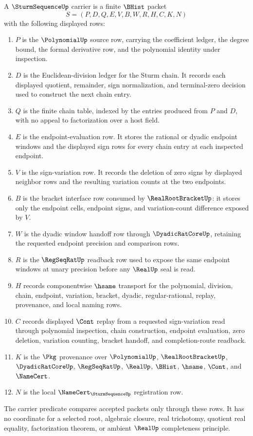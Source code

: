 \begin{definition}
\label{def:sturm-sequence-real-carrier}
A $\SturmSequenceUp$ carrier is a finite $\BHist$ packet
$$
S=(P,D,Q,E,V,B,W,R,H,C,K,N)
$$
with the following displayed rows:
\begin{enumerate}
\item $P$ is the $\PolynomialUp$ source row, carrying the coefficient ledger, the degree bound, the formal derivative row, and the polynomial identity under inspection.
\item $D$ is the Euclidean-division ledger for the Sturm chain. It records each displayed quotient, remainder, sign normalization, and terminal-zero decision used to construct the next chain entry.
\item $Q$ is the finite chain table, indexed by the entries produced from $P$ and $D$, with no appeal to factorization over a host field.
\item $E$ is the endpoint-evaluation row. It stores the rational or dyadic endpoint windows and the displayed sign rows for every chain entry at each inspected endpoint.
\item $V$ is the sign-variation row. It records the deletion of zero signs by displayed neighbor rows and the resulting variation counts at the two endpoints.
\item $B$ is the bracket interface row consumed by $\RealRootBracketUp$: it stores only the endpoint cells, endpoint signs, and variation-count difference exposed by $V$.
\item $W$ is the dyadic window handoff row through $\DyadicRatCoreUp$, retaining the requested endpoint precision and comparison rows.
\item $R$ is the $\RegSeqRatUp$ readback row used to expose the same endpoint windows at unary precision before any $\RealUp$ seal is read.
\item $H$ records componentwise $\hsame$ transport for the polynomial, division, chain, endpoint, variation, bracket, dyadic, regular-rational, replay, provenance, and local naming rows.
\item $C$ records displayed $\Cont$ replay from a requested sign-variation read through polynomial inspection, chain construction, endpoint evaluation, zero deletion, variation counting, bracket handoff, and completion-route readback.
\item $K$ is the $\Pkg$ provenance over $\PolynomialUp$, $\RealRootBracketUp$, $\DyadicRatCoreUp$, $\RegSeqRatUp$, $\RealUp$, $\BHist$, $\hsame$, $\Cont$, and $\NameCert$.
\item $N$ is the local $\NameCert_{\SturmSequenceUp}$ registration row.
\end{enumerate}
The carrier predicate compares accepted packets only through these rows. It has no coordinate for a selected root, algebraic closure, real trichotomy, quotient real equality, factorization theorem, or ambient $\RealUp$ completeness principle.
\end{definition}


